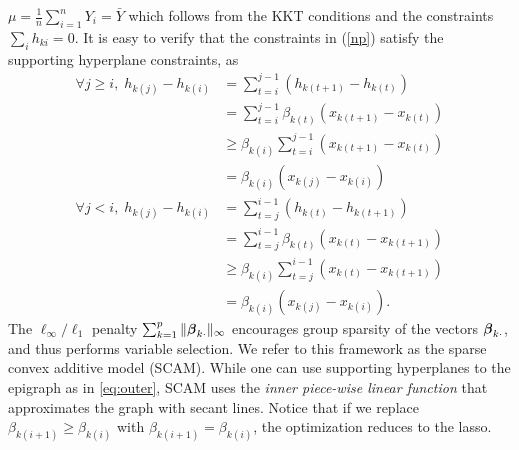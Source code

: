 $\mu = \frac{1}{n} \sum_{i=1}^n Y_i = \bar{Y}$ which follows from the
KKT conditions
and the constraints $\sum_i h_{ki} = 0$.
It is easy to verify that the constraints in (\ref{np}) satisfy the supporting hyperplane constraints, as
\begin{align*}
  \forall j\geq{}i,\; h_{k(j)}-h_{k(i)}  &= 
            \sum\limits_{t=i}^{j-1}(h_{k(t+1)}-h_{k(t)}) \\
      & = \sum\limits_{t=i}^{j-1}\beta_{k(t)}(x_{k(t+1)}-x_{k(t)})\\ 
      & \geq \beta_{k(i)}\sum\limits_{t=i}^{j-1}(x_{k(t+1)}-x_{k(t)}) \\
      & = \beta_{k(i)}(x_{k(j)}-x_{k(i)}) \\
  \forall j<i,\;  h_{k(j)}-h_{k(i)} &=
                \sum\limits_{t=j}^{i-1}(h_{k(t)}-h_{k(t+1)}) \\
     &= \sum\limits_{t=j}^{i-1}\beta_{k(t)}(x_{k(t)}-x_{k(t+1)}) \\ 
     & \geq \beta_{k(i)}\sum\limits_{t=j}^{i-1}(x_{k(t)}-x_{k(t+1)})  \\
     &= \beta_{k(i)}(x_{k(j)}-x_{k(i)}).
\end{align*}
The $\ell_\infty/\ell_1$ penalty
$\sum_{k=1}^{p}\|\boldsymbol{\beta}_{k\cdot}\|_{\infty}$ encourages group
sparsity of the vectors $\boldsymbol{\beta}_{k\cdot}$, and thus performs
variable selection.  We refer to this framework as the sparse convex
additive model (SCAM). While one can use
supporting hyperplanes to the epigraph as in \eqref{eq:outer}, 
SCAM uses the \emph{inner  piece-wise linear function}
that approximates the graph with secant lines. Notice that if we replace $\beta_{k(i+1)} \geq
\beta_{k(i)}$ with $\beta_{k(i+1)}=\beta_{k(i)}$, the optimization
reduces to the lasso.  



